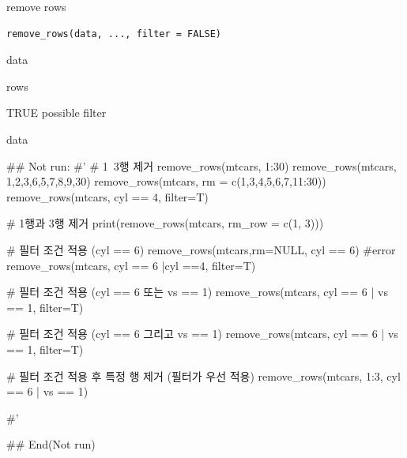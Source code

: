 \documentclass[a4paper]{book}
\begin{document}
%
\begin{Description}
remove rows
\end{Description}
%
\begin{Usage}
\begin{verbatim}
remove_rows(data, ..., filter = FALSE)
\end{verbatim}
\end{Usage}
%
\begin{Arguments}
\begin{ldescription}
\item[\code{data}] data

\item[\code{...}] rows

\item[\code{filter}] TRUE possible filter
\end{ldescription}
\end{Arguments}
%
\begin{Value}
data
\end{Value}
%
\begin{Examples}
\begin{ExampleCode}

\#\# Not run: 
#'
# 1~3행 제거
remove_rows(mtcars,  1:30)
remove_rows(mtcars, 1,2,3,6,5,7,8,9,30)
remove_rows(mtcars, rm = c(1,3,4,5,6,7,11:30))
remove_rows(mtcars, cyl == 4, filter=T)

# 1행과 3행 제거
print(remove_rows(mtcars, rm_row = c(1, 3)))

# 필터 조건 적용 (cyl == 6)
remove_rows(mtcars,rm=NULL, cyl == 6) #error
remove_rows(mtcars, cyl == 6 |cyl ==4, filter=T)

# 필터 조건 적용 (cyl == 6 또는 vs == 1)
remove_rows(mtcars, cyl == 6 | vs == 1, filter=T)

# 필터 조건 적용 (cyl == 6 그리고 vs == 1)
remove_rows(mtcars, cyl == 6 | vs == 1, filter=T)

# 필터 조건 적용 후 특정 행 제거 (필터가 우선 적용)
remove_rows(mtcars, 1:3, cyl == 6 | vs == 1)

#'

## End(Not run)


\end{ExampleCode}
\end{Examples}
\end{document}
